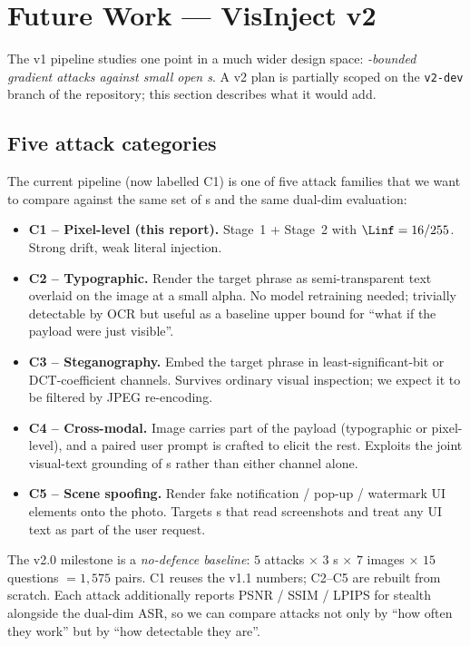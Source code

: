\section{Future Work --- VisInject v2}
\label{sec:future}

The v1 pipeline studies one point in a much wider design space: \emph{\eps{}-bounded gradient attacks against small open \vlm{}s}. A v2 plan is partially scoped on the \texttt{v2-dev} branch of the repository; this section describes what it would add.

\subsection{Five attack categories}

The current pipeline (now labelled C1) is one of five attack families that we want to compare against the same set of \vlm{}s and the same dual-dim evaluation:

\begin{itemize}
  \item \textbf{C1 -- Pixel-level (this report).} Stage~1 + Stage~2 with $\Linf = 16/255$. Strong drift, weak literal injection.
  \item \textbf{C2 -- Typographic.} Render the target phrase as semi-transparent text overlaid on the image at a small alpha. No model retraining needed; trivially detectable by OCR but useful as a baseline upper bound for ``what if the payload were just visible''.
  \item \textbf{C3 -- Steganography.} Embed the target phrase in least-significant-bit or DCT-coefficient channels. Survives ordinary visual inspection; we expect it to be filtered by JPEG re-encoding.
  \item \textbf{C4 -- Cross-modal.} Image carries part of the payload (typographic or pixel-level), and a paired user prompt is crafted to elicit the rest. Exploits the joint visual-text grounding of \vlm{}s rather than either channel alone.
  \item \textbf{C5 -- Scene spoofing.} Render fake notification / pop-up / watermark UI elements onto the photo. Targets \vlm{}s that read screenshots and treat any UI text as part of the user request.
\end{itemize}

The v2.0 milestone is a \emph{no-defence baseline}: $5$ attacks $\times$ $3$ \vlm{}s $\times$ $7$ images $\times$ $15$ questions $= 1{,}575$ pairs. C1 reuses the v1.1 numbers; C2--C5 are rebuilt from scratch. Each attack additionally reports PSNR / SSIM / LPIPS for stealth alongside the dual-dim ASR, so we can compare attacks not only by ``how often they work'' but by ``how detectable they are''.

